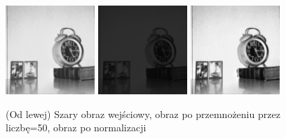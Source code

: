 \documentclass[final,a4paper,openany,12pt]{mwbk}
\begin{document}
\begin{figure}[H]
	\begin{center}
		\includegraphics[width=0.3\textwidth]{1/1Gray_Const_Multipl_Original}
		\includegraphics[width=0.3\textwidth]{1/1Gray_Const_Multipl_Result} 
		\includegraphics[width=0.3\textwidth]{1/1Gray_Const_Multipl_Result_Norm}
	\end{center}
	\caption{(Od lewej) Szary obraz wejściowy, obraz po przemnożeniu przez liczbę=50, obraz po normalizacji }
\end{figure}
\end{document}
